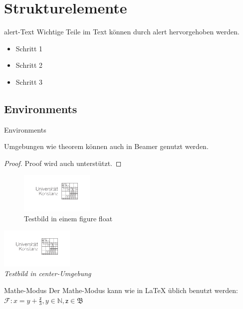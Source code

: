 \documentclass[t,aspectratio=169,dvipsnames]{beamer}
\begin{document}
\section{Strukturelemente}
\begin{frame}{alert-Text}
	Wichtige Teile im Text können \alert<2>{durch alert hervorgehoben} werden.
	\begin{itemize}[<+-|alert@+>]
		\item Schritt 1
		\item Schritt 2
		\item Schritt 3
	\end{itemize}
\end{frame}

\subsection{Environments}
\begin{frame}{Environments}
\begin{theorem}
	Umgebungen wie theorem können auch in Beamer genutzt werden.
\end{theorem}
\begin{proof}
	Proof wird auch unterstützt.
\end{proof}
\begin{figure}
	\includegraphics[width=3.5cm]{HochschuleLogo}
	\caption{Testbild in einem figure float}
\end{figure}
\begin{center}
	\includegraphics[width=3.5cm]{HochschuleLogo}\\
	\emph{Testbild in center-Umgebung}
\end{center}
\end{frame}

\begin{frame}{Mathe-Modus}
	Der Mathe-Modus kann wie in LaTeX üblich benutzt werden:\\ 
	$\mathcal{F}: x = y + \frac{\mathsf{z}}{3}, y \in \mathbb{N}, \mathsf{z} \in \mathfrak{B}$ 
\end{frame}
\end{document}
